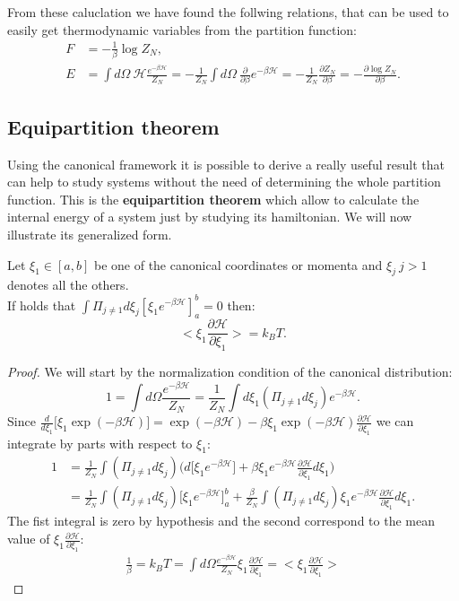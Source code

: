 From these caluclation we have found the follwing relations, that can be used to easily get thermodynamic variables from the partition function:
\begin{align*}
    F&=-\frac{1}{\beta}\log Z_N,\\
    E&=\int d\Omega\ \mathcal{H} \frac{e^{-\beta\mathcal{H} }}{Z_N}=-\frac{1}{Z_N}\int d\Omega\ \frac{\partial}{\partial\beta} e^{-\beta\mathcal{H} }=-\frac{1}{Z_N}\frac{\partial Z_N}{\partial\beta}=-\frac{\partial\log Z_N}{\partial\beta}.
\end{align*} 
\subsection{Equipartition theorem}
Using the canonical framework it is possible to derive a really useful result that can help to study systems without the need of determining the whole partition function. This is the \textbf{equipartition theorem} which allow to calculate the internal energy of a system just by studying its hamiltonian. We will now illustrate its generalized form.
\begin{theorem}\label{thm:GeneralizedEquipartition}
    Let $\xi_1\in[a,b]$ be one of the canonical coordinates or momenta and $\xi_j\ j>1$ denotes all the others.\\ If holds that $\int \Pi_{j\neq1}d\xi_j[\xi_1e^{-\beta\mathcal{H} }]_a^b=0$ then:
    \begin{equation}
        \bigg<\xi_1\frac{\partial\mathcal{H} }{\partial \xi_1}\bigg>=k_BT.
    \end{equation}
\end{theorem}
\begin{proof}
    We will start by the normalization condition of the canonical distribution:
    \begin{equation*}
        1=\int d\Omega\frac{e^{-\beta\mathcal{H} }}{Z_N}=\frac{1}{Z_N}\int d\xi_1(\Pi_{j\neq1}d\xi_j) e^{-\beta\mathcal{H}}.
    \end{equation*}
    Since $\frac{d}{d\xi_1}\big[\xi_1\exp(-\beta\mathcal{H} )\big]=\exp(-\beta\mathcal{H} )-\beta\xi_1\exp(-\beta\mathcal{H} )\frac{\partial\mathcal{H} }{\partial\xi_1}$ we can integrate by parts with respect to $\xi_1$:
    \begin{align*}
        1&=\frac{1}{Z_N}\int(\Pi_{j\neq1}d\xi_j)\bigg(d\big[\xi_1e^{-\beta\mathcal{H}}\big]+\beta\xi_1e^{-\beta\mathcal{H}}\frac{\partial\mathcal{H} }{\partial\xi_1}d\xi_1\bigg) \\
        &=\frac{1}{Z_N}\int(\Pi_{j\neq1}d\xi_j)\big[\xi_1e^{-\beta\mathcal{H}}\big]_a^b+\frac{\beta}{Z_N}\int(\Pi_{j\neq1}d\xi_j)\xi_1e^{-\beta\mathcal{H}}\frac{\partial\mathcal{H} }{\partial\xi_1}d\xi_1.
    \end{align*}
    The fist integral is zero by hypothesis and the second correspond to the mean value of $\xi_1\frac{\partial\mathcal{H} }{\partial \xi_1}$:
    \begin{align*}
        \frac{1}{\beta}=k_BT=\int d\Omega\frac{e^{-\beta\mathcal{H} }}{Z_N}\xi_1\frac{\partial\mathcal{H} }{\partial \xi_1}=\bigg<\xi_1\frac{\partial\mathcal{H} }{\partial \xi_1}\bigg>
    \end{align*}
\end{proof}
